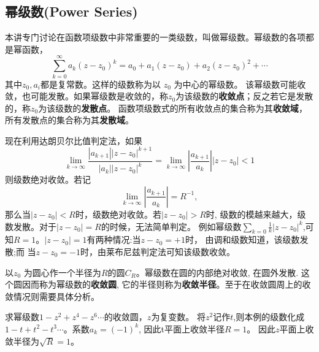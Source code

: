 \subsection{幂级数(Power Series)}
本讲专门讨论在函数项级数中非常重要的一类级数，叫做幂级数。幂级数的各项都是幂函数，
\begin{equation}
    \sum_{k=0}^{\infty} a_k\left(z-z_0\right)^k=a_0+a_1\left(z-z_0\right)+a_2\left(z-z_0\right)^2+\cdots
\end{equation}
其中$z_0, a_i$都是复常数。这样的级数称为以 $z_0$ 为中心的幂级数。
该幂级数可能收敛，也可能发散。如果幂级数是收敛的，称$z_0$为该级数的\textbf{收敛点}；反之若它是发散的，称$z_0$为该级数的\textbf{发散点}。
函数项级数式的所有收敛点的集合称为其\textbf{收敛域}，所有发散点的集合称为其\textbf{发散域}。

现在利用达朗贝尔比值判定法，如果
\begin{equation}
    \lim _{k \rightarrow \infty} \frac{\left|a_{k+1}\right|\left|z-z_0\right|^{k+1}}{\left|a_k\right|\left|z-z_0\right|^k}
    =\lim _{k \rightarrow \infty}\left|\frac{a_{k+1}}{a_k}\right|\left|z-z_0\right|<1
\end{equation}
则级数绝对收敛。若记
\begin{equation}
    \lim_{k \rightarrow \infty} \left|\frac{a_{k+1}}{a_k}\right| = R^{-1},
\end{equation}
那么当$|z-z_0| < R$时，级数绝对收敛。若$|z-z_0| > R$时, 级数的模越来越大，级数发散。对于$|z-z_0| = R$的时候，无法简单判定。
例如幂级数$\sum_{k=0} \frac{1}{k} |z-z_0|^k$,可知$R=1$。$|z-z_0|=1$有两种情况:当$z-z_0 = +1$时， 由调和级数知道，该级数发散;而
当$z-z_0 = -1$时，由莱布尼兹判定法可知该级数收敛。

以$z_0$ 为圆心作一个半径为$R$的圆$C_R$。幂级数在圆的内部绝对收敛, 在圆外发散. 这个圆因而称为幂级数的\textbf{收敛圆}, 
它的半径则称为\textbf{收敛半径}。至于在收敛圆周上的收敛情况则需要具体分析。

\begin{examplebox}{求幂级数$1 - z^2 + z^4 - z^6\cdots$的收敛圆，$z$为复变数。}
    将$z^2$记作$t$,则本例的级数化成$1-t + t^2 - t^3\cdots$。系数$a_k =(-1)^k$, 因此t平面上收敛半径$R=1$。 
    因此$z$平面上收敛半径为$\sqrt{R}=1$。
\end{examplebox}